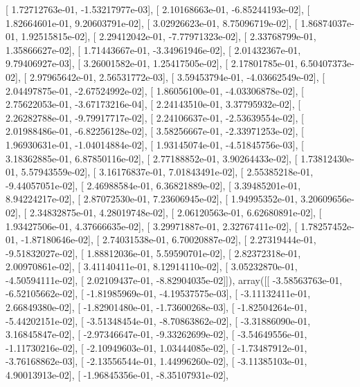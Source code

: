 \documentclass{article}
\begin{document}
       [  1.72712763e-01,  -1.53217977e-03],
       [  2.10168663e-01,  -6.85244193e-02],
       [  1.82664601e-01,   9.20603791e-02],
       [  3.02926623e-01,   8.75096719e-02],
       [  1.86874037e-01,   1.92515815e-02],
       [  2.29412042e-01,  -7.77971323e-02],
       [  2.33768799e-01,   1.35866627e-02],
       [  1.71443667e-01,  -3.34961946e-02],
       [  2.01432367e-01,   9.79406927e-03],
       [  3.26001582e-01,   1.25417505e-02],
       [  2.17801785e-01,   6.50407373e-02],
       [  2.97965642e-01,   2.56531772e-03],
       [  3.59453794e-01,  -4.03662549e-02],
       [  2.04497875e-01,  -2.67524992e-02],
       [  1.86056100e-01,  -4.03306878e-02],
       [  2.75622053e-01,  -3.67173216e-04],
       [  2.24143510e-01,   3.37795932e-02],
       [  2.26282788e-01,  -9.79917717e-02],
       [  2.24106637e-01,  -2.53639554e-02],
       [  2.01988486e-01,  -6.82256128e-02],
       [  3.58256667e-01,  -2.33971253e-02],
       [  1.96930631e-01,  -1.04014884e-02],
       [  1.93145074e-01,  -4.51845756e-03],
       [  3.18362885e-01,   6.87850116e-02],
       [  2.77188852e-01,   3.90264433e-02],
       [  1.73812430e-01,   5.57943559e-02],
       [  3.16176837e-01,   7.01843491e-02],
       [  2.55385218e-01,  -9.44057051e-02],
       [  2.46988584e-01,   6.36821889e-02],
       [  3.39485201e-01,   8.94224217e-02],
       [  2.87072530e-01,   7.23606945e-02],
       [  1.94995352e-01,   3.20609656e-02],
       [  2.34832875e-01,   4.28019748e-02],
       [  2.06120563e-01,   6.62680891e-02],
       [  1.93427506e-01,   4.37666635e-02],
       [  3.29971887e-01,   2.32767411e-02],
       [  1.78257452e-01,  -1.87180646e-02],
       [  2.74031538e-01,   6.70020887e-02],
       [  2.27319444e-01,  -9.51832027e-02],
       [  1.88812036e-01,   5.59590701e-02],
       [  2.82372318e-01,   2.00970861e-02],
       [  3.41140411e-01,   8.12914110e-02],
       [  3.05232870e-01,  -4.50594111e-02],
       [  2.02109437e-01,  -8.82904035e-02]]), array([[ -3.58563763e-01,  -6.52105662e-02],
       [ -1.81985969e-01,  -4.19537575e-03],
       [ -3.11132411e-01,   2.66849380e-02],
       [ -1.82901480e-01,  -1.73600268e-03],
       [ -1.82504264e-01,  -5.44202151e-02],
       [ -3.51348454e-01,  -8.70863862e-02],
       [ -3.31886090e-01,   3.16845847e-02],
       [ -2.97346647e-01,  -9.33262699e-02],
       [ -3.54649556e-01,  -1.11730216e-02],
       [ -2.10949603e-01,   1.03444085e-02],
       [ -1.73487912e-01,  -3.76168862e-03],
       [ -2.13556544e-01,   1.44996260e-02],
       [ -3.11385103e-01,   4.90013913e-02],
       [ -1.96845356e-01,  -8.35107931e-02],
\end{document}
